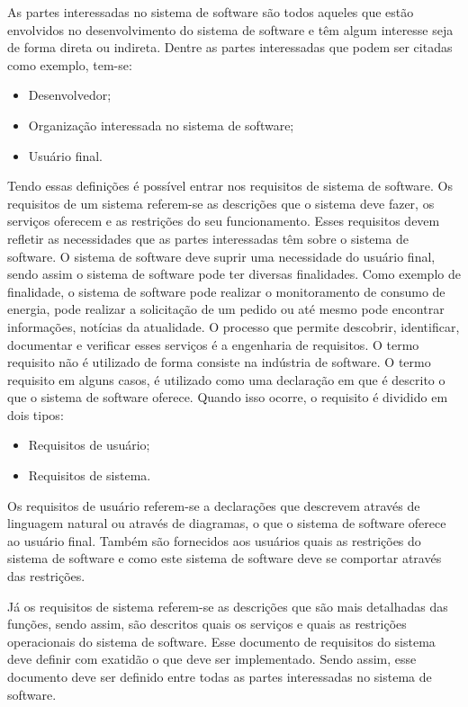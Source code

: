 \documentclass[a4paper,twoside]{article}
\begin{document}
As partes interessadas no sistema de software são todos aqueles que estão envolvidos no desenvolvimento do sistema de software e têm algum interesse seja de forma direta ou indireta. Dentre as partes interessadas que podem ser citadas como exemplo, tem-se\cite{sevocab}:
\begin{itemize}
    \item Desenvolvedor;
    \item Organização interessada no sistema de software;
    \item Usuário final.
\end{itemize}

Tendo essas definições é possível entrar nos requisitos de sistema de software. Os requisitos de um sistema referem-se as descrições que o sistema deve fazer, os serviços oferecem e as restrições do seu funcionamento. Esses requisitos devem refletir as necessidades que as partes interessadas têm sobre o sistema de software. O sistema de software deve suprir uma necessidade do usuário final, sendo assim o sistema de software pode ter diversas finalidades. Como exemplo de finalidade, o sistema de software pode realizar o monitoramento de consumo de energia, pode realizar a solicitação de um pedido ou até mesmo pode encontrar informações, notícias da atualidade. O processo que permite descobrir, identificar, documentar e verificar esses serviços é a engenharia de requisitos\cite{Sommerville_2011_texbook}.
O termo requisito não é utilizado de forma consiste na indústria de software. O termo requisito em alguns casos, é utilizado como uma declaração em que é descrito o que o sistema de software oferece. Quando isso ocorre, o requisito é dividido em dois tipos\cite{Sommerville_2011_texbook}:
\begin{itemize}
    \item Requisitos de usuário;
    \item Requisitos de sistema.
\end{itemize}

Os requisitos de usuário referem-se a declarações que descrevem através de linguagem natural ou através de diagramas, o que o sistema de software oferece ao usuário final. Também são fornecidos aos usuários quais as restrições do sistema de software e como este sistema de software deve se comportar através das restrições\cite{Sommerville_2011_texbook}.

Já os requisitos de sistema referem-se as descrições que são mais detalhadas das funções, sendo assim, são descritos quais os serviços e quais as restrições operacionais do sistema de software. Esse documento de requisitos do sistema deve definir com exatidão o que deve ser implementado. Sendo assim, esse documento deve ser definido entre todas as partes interessadas no sistema de software\cite{Sommerville_2011_texbook}.
\end{document}
